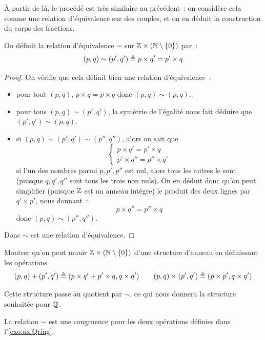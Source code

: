 \`A partir de là, le procédé est très similaire au précédent~: on considère cela
comme une relation d'équivalence sur des couples, et on en déduit la
construction du corps des fractions.

\begin{definition}
  On définit la relation d'équivalence $\sim$ sur
  $\mathbb Z \times (\mathbb N\setminus\{0\})$ par~:
  \[(p,q) \sim (p',q') \triangleq p\times q' = p'\times q\]
\end{definition}

\begin{proof}
  On vérifie que cela définit bien une relation d'équivalence~:
  \begin{itemize}
  \item pour tout $(p,q)$, $p\times q = p \times q$ donc $(p,q)\sim(p,q)$.
  \item pour tous $(p,q)\sim (p',q')$, la symétrie de l'égalité nous fait
    déduire que $(p',q')\sim(p,q)$.
  \item si $(p,q)\sim(p',q')\sim(p'',q'')$, alors on sait que
    \[\begin{cases}
    p\times q' = p' \times q\\
    p' \times q'' = p'' \times q'
    \end{cases}\]
    si l'un des nombres parmi $p,p',p''$ est nul, alors tous les autres le sont
    (puisque $q,q',q''$ sont tous les trois non nuls). On en déduit donc qu'on
    peut simplifier (puisque $\mathbb Z$ est un anneau intègre) le produit des
    deux lignes par $q'\times p'$, nous donnant~:
    \[p\times q'' = p'' \times q\]
    donc $(p,q)\sim(p'',q'')$.
  \end{itemize}
  Donc $\sim$ est une relation d'équivalence.
\end{proof}

\begin{exercise}\label{exo.ax.Qring}
  Montrer qu'on peut munir $\mathbb Z\times (\mathbb N\setminus\{0\})$ d'une
  structure d'anneau en définissant les opérations
  \[(p,q)+(p',q') \triangleq (p\times q' + p' \times q, q\times q')\qquad
  (p,q)\times(p',q')\triangleq (p\times p',q\times q')\]
\end{exercise}

\noindent
Cette structure passe au quotient par $\sim$, ce qui nous donnera la structure
souhaitée pour $\mathbb Q$.

\begin{proposition}
  La relation $\sim$ est une congruence pour les deux opérations définies dans
  l'\cref{exo.ax.Qring}.
\end{proposition}

